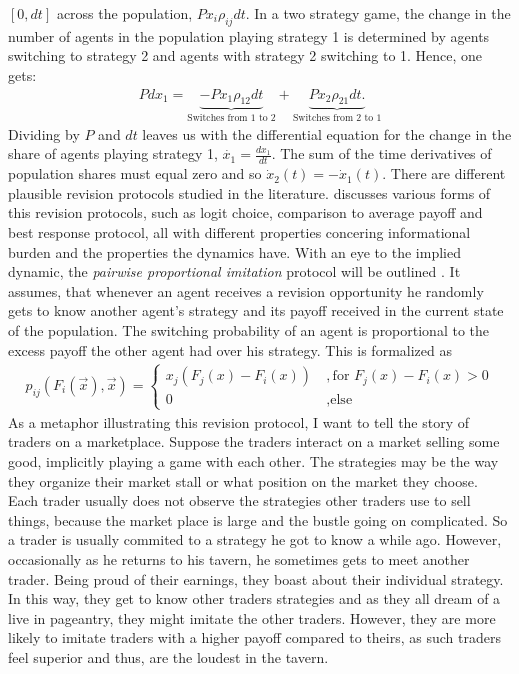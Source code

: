 \documentclass[11pt]{article}
\begin{document}
$[0,dt]$ across the population,  $P x_i \rho_{ij} dt$. 
In a two strategy game, the change in the number of agents in the population 
playing strategy 1 is determined by agents switching to strategy 2 
and agents with strategy 2 switching to 1. Hence, one gets:
\begin{align} 
        Pdx_1 =  \underbrace{-Px_1 \rho_{12}dt}_{\text{Switches from 1 to 2}} 
        + \underbrace{Px_2 \rho_{21}dt.}_{\text{Switches from 2 to 1}}
\end{align}
Dividing by $P$ and $dt$ leaves us with the differential equation for
the change in the share of agents playing strategy 1, 
$\dot{x_1} =\frac{dx_1}{dt}$. 
The sum of the time derivatives of population shares must equal zero and so
$\dot{x}_2(t) =- \dot{x}_1(t)$.
There are different plausible revision protocols studied in the literature. 
\textcite[128,129,178]{sandholm_population_2010} discusses various forms of 
this revision protocols, such as logit choice, comparison to average payoff 
and best response 
protocol, all with different properties concering informational 
burden and the
properties the dynamics have. With an eye to the implied dynamic, the 
\textit{pairwise proportional imitation} protocol will be outlined . 
It assumes, that whenever an
agent receives a revision opportunity he randomly gets to know 
another agent's strategy and its payoff received in the current 
state of the population. 
The switching probability of an agent is proportional to the 
excess payoff the other agent had over his strategy. This is formalized as 
\begin{align}
        \label{eq:pairwiseproportionalimitation}
        p_{ij}(F_i(\vec{x}),\vec{x}) =
                \begin{cases}
                        x_j(F_j(x) -F_i(x)) &\ , \text{for } F_j(x) - F_i(x) > 0 \\
                        0 &\ , \text{else}
                \end{cases}
\end{align}
As a metaphor illustrating this revision protocol, I want to tell the 
story of traders on a marketplace.
Suppose the traders interact on a market selling some 
good, implicitly playing a game with each other. The strategies may be the
way they organize their market stall or what position on the market they 
choose. Each trader usually does not
observe the strategies other traders use to sell things, because the market
place is large and the bustle going on complicated. 
So a trader is usually commited to a strategy he got to know a while ago.
However, occasionally as he returns to his tavern, he sometimes gets to meet 
another trader. Being proud of their earnings, they boast about their 
individual strategy. In this way, they get to know
other traders strategies and as they all dream of a live in pageantry,
they might imitate the other traders. 
However, they are more likely to imitate traders with a higher payoff 
compared to theirs, as such traders feel superior and thus, are the 
loudest in the tavern. 
\end{document}
